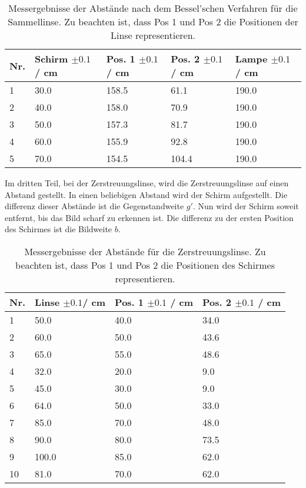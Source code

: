 \documentclass[12pt,a4paper,twoside]{article}
\begin{document}
\begin{table}[H]
    \centering
    \caption{Messergebnisse der Abstände nach dem Bessel'schen Verfahren für die Sammellinse. Zu beachten ist, dass Pos 1 und Pos 2 die Positionen der Linse representieren. }
    \label{tab:messergebnisse Bessel}
    \begin{tabular}{| l | l | l | l | l |}
        \hline
        Nr.  & Schirm $\pm 0.1 $ / cm &  Pos. 1 $\pm 0.1 $ / cm & Pos. 2 $\pm 0.1 $ / cm & Lampe $\pm 0.1 $ / cm \\
        \hline
        1  & 30.0   & 158.5 & 61.1  & 190.0 \\
        2  & 40.0   & 158.0 & 70.9  & 190.0 \\
        3  & 50.0   & 157.3 & 81.7  & 190.0 \\
        4  & 60.0   & 155.9 & 92.8  & 190.0 \\
        5  & 70.0   & 154.5 & 104.4 & 190.0 \\
        \hline
    \end{tabular}
\end{table}

\noindent
Im dritten Teil, bei der Zerstreuungslinse, wird die Zerstreuungslinse auf einen Abstand gestellt. In einen beliebigen Abstand wird der Schirm aufgestellt. 
Die differenz dieser Abstände ist die Gegenstandweite $g'$. Nun wird der Schirm soweit entfernt, bis das Bild scharf zu erkennen ist. 
Die differenz zu der ersten Position des Schirmes ist die Bildweite $b$. 

\begin{table}[H]
    \centering
    \caption{Messergebnisse der Abstände für die Zerstreuungslinse. Zu beachten ist, dass Pos 1 und Pos 2 die Positionen des Schirmes representieren. }
    \label{tab:messergebnisse Zerstreuungslinse}
    \begin{tabular}{| l | l | l | l |}
        \hline
        Nr.  & Linse $\pm 0.1 $/ cm & Pos. 1 $\pm 0.1 $ / cm & Pos. 2 $\pm 0.1 $ / cm \\
        \hline
        1  & 50.0   & 40.0 & 34.0 \\
        2  & 60.0   & 50.0 & 43.6 \\
        3  & 65.0   & 55.0 & 48.6 \\
        4  & 32.0   & 20.0 & 9.0  \\
        5  & 45.0   & 30.0 & 9.0  \\
        6  & 64.0   & 50.0 & 33.0 \\
        7  & 85.0   & 70.0 & 48.0 \\
        8  & 90.0   & 80.0 & 73.5 \\
        9  & 100.0  & 85.0 & 62.0 \\
        10 & 81.0   & 70.0 & 62.0 \\
        \hline
    \end{tabular}
\end{table}
\end{document}
